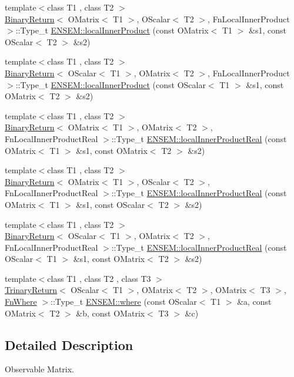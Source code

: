 \begin{DoxyCompactItemize}
\item 
{\footnotesize template$<$class T1 , class T2 $>$ }\\\mbox{\hyperlink{structBinaryReturn}{Binary\+Return}}$<$ O\+Matrix$<$ T1 $>$, O\+Scalar$<$ T2 $>$, Fn\+Local\+Inner\+Product $>$\+::Type\+\_\+t \mbox{\hyperlink{group__obsmatrix_ga23c94fe0afdadaedf50d233d675f0009}{E\+N\+S\+E\+M\+::local\+Inner\+Product}} (const O\+Matrix$<$ T1 $>$ \&s1, const O\+Scalar$<$ T2 $>$ \&s2)
\item 
{\footnotesize template$<$class T1 , class T2 $>$ }\\\mbox{\hyperlink{structBinaryReturn}{Binary\+Return}}$<$ O\+Scalar$<$ T1 $>$, O\+Matrix$<$ T2 $>$, Fn\+Local\+Inner\+Product $>$\+::Type\+\_\+t \mbox{\hyperlink{group__obsmatrix_gac43a43c02ea508251047ef46cbc6924c}{E\+N\+S\+E\+M\+::local\+Inner\+Product}} (const O\+Scalar$<$ T1 $>$ \&s1, const O\+Matrix$<$ T2 $>$ \&s2)
\item 
{\footnotesize template$<$class T1 , class T2 $>$ }\\\mbox{\hyperlink{structBinaryReturn}{Binary\+Return}}$<$ O\+Matrix$<$ T1 $>$, O\+Matrix$<$ T2 $>$, Fn\+Local\+Inner\+Product\+Real $>$\+::Type\+\_\+t \mbox{\hyperlink{group__obsmatrix_gacc55b39949beec3cc3690b3c892801d2}{E\+N\+S\+E\+M\+::local\+Inner\+Product\+Real}} (const O\+Matrix$<$ T1 $>$ \&s1, const O\+Matrix$<$ T2 $>$ \&s2)
\item 
{\footnotesize template$<$class T1 , class T2 $>$ }\\\mbox{\hyperlink{structBinaryReturn}{Binary\+Return}}$<$ O\+Matrix$<$ T1 $>$, O\+Scalar$<$ T2 $>$, Fn\+Local\+Inner\+Product\+Real $>$\+::Type\+\_\+t \mbox{\hyperlink{group__obsmatrix_ga3b363fa48471a9d3fc6da5cbfcb21fb5}{E\+N\+S\+E\+M\+::local\+Inner\+Product\+Real}} (const O\+Matrix$<$ T1 $>$ \&s1, const O\+Scalar$<$ T2 $>$ \&s2)
\item 
{\footnotesize template$<$class T1 , class T2 $>$ }\\\mbox{\hyperlink{structBinaryReturn}{Binary\+Return}}$<$ O\+Scalar$<$ T1 $>$, O\+Matrix$<$ T2 $>$, Fn\+Local\+Inner\+Product\+Real $>$\+::Type\+\_\+t \mbox{\hyperlink{group__obsmatrix_gad83f3516610f8446eb55b7e511c807be}{E\+N\+S\+E\+M\+::local\+Inner\+Product\+Real}} (const O\+Scalar$<$ T1 $>$ \&s1, const O\+Matrix$<$ T2 $>$ \&s2)
\item 
{\footnotesize template$<$class T1 , class T2 , class T3 $>$ }\\\mbox{\hyperlink{structTrinaryReturn}{Trinary\+Return}}$<$ O\+Scalar$<$ T1 $>$, O\+Matrix$<$ T2 $>$, O\+Matrix$<$ T3 $>$, \mbox{\hyperlink{structFnWhere}{Fn\+Where}} $>$\+::Type\+\_\+t \mbox{\hyperlink{group__obsmatrix_ga9938a7a656eaaa3617a11303334942ef}{E\+N\+S\+E\+M\+::where}} (const O\+Scalar$<$ T1 $>$ \&a, const O\+Matrix$<$ T2 $>$ \&b, const O\+Matrix$<$ T3 $>$ \&c)
\end{DoxyCompactItemize}


\subsection{Detailed Description}
Observable Matrix. 

